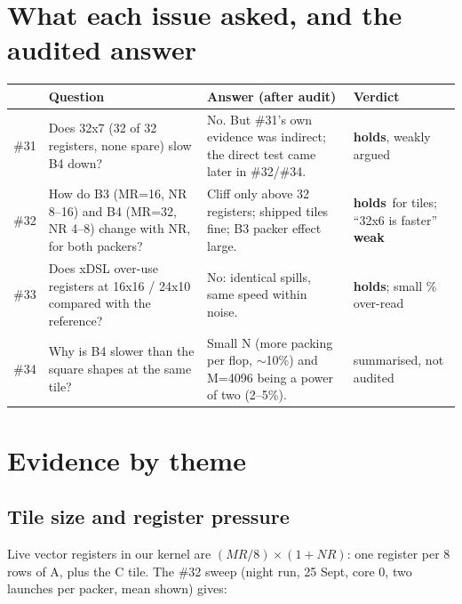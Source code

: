\documentclass[10pt,a4paper]{article}
\newcommand{\ok}{\textcolor{green!45!black}{\textbf{holds}}}
\newcommand{\weak}{\textcolor{orange!80!black}{\textbf{weak}}}
\begin{document}
\section{What each issue asked, and the audited answer}
\begin{tabularx}{\linewidth}{@{}l X X l@{}}
\toprule
& \textbf{Question} & \textbf{Answer (after audit)} & \textbf{Verdict} \\
\midrule
\#31 & Does 32x7 (32 of 32 registers, none spare) slow B4 down? & No. But \#31's own evidence was
indirect; the direct test came later in \#32/\#34. & \ok, weakly argued \\
\#32 & How do B3 (MR=16, NR 8--16) and B4 (MR=32, NR 4--8) change with NR, for both packers? & Cliff
only above 32 registers; shipped tiles fine; B3 packer effect large. & \ok\ for tiles; ``32x6 is
faster'' \weak \\
\#33 & Does xDSL over-use registers at 16x16 / 24x10 compared with the reference? & No: identical
spills, same speed within noise. & \ok; small \% over-read \\
\#34 & Why is B4 slower than the square shapes at the same tile? & Small N (more packing per flop,
$\sim$10\%) and M=4096 being a power of two (2--5\%). & summarised, not audited \\
\bottomrule
\end{tabularx}

\section{Evidence by theme}

\subsection{Tile size and register pressure}
Live vector registers in our kernel are $(MR/8)\times(1+NR)$: one register per 8 rows of A, plus the
C tile. The \#32 sweep (night run, 25 Sept, core 0, two launches per packer, mean shown) gives:
\end{document}
